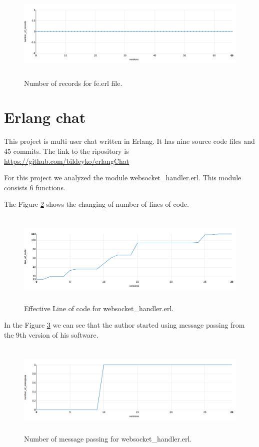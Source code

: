 \begin{figure}[h]
	\centering
	\includegraphics[height=45mm]{figures/number_of_records_iron.png}
	\caption{Number of records for fe.erl file.}
	\label{fig:number_of_records_iron}
\end{figure}

\section{Erlang chat }

This project is multi user chat written in Erlang. It has nine source code files and 45 commits. The link to the ripository is \url{https://github.com/bildeyko/erlangChat}

For this project we analyzed the module websocket\_handler.erl. This module consists 6 functions.

The Figure \ref{fig:loc_chat} shows the changing of number of lines of code.

\begin{figure}[h]
	\centering
	\includegraphics[height=45mm]{figures/loc_chat.png}
	\caption{Effective Line of code for websocket\_handler.erl.}
	\label{fig:loc_chat}
\end{figure}

In the Figure \ref{fig:chat} we can see that the author started using message passing from the 9th version of his software.

\begin{figure}[h]
	\centering
	\includegraphics[height=45mm]{figures/chat.png}
	\caption{Number of message passing for websocket\_handler.erl.}
	\label{fig:chat}
\end{figure}

